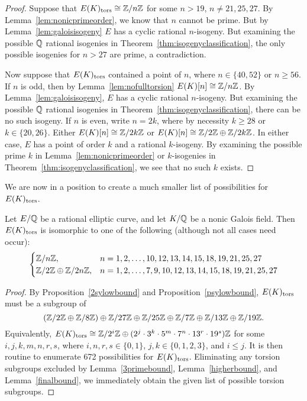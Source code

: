 \begin{proof}
Suppose that $E(K)_{\text{tors}} \cong \mathbb{Z}/n\mathbb{Z}$ for some $n > 19$, $n \neq 21, 25, 27$. By Lemma~\ref{lem:nonicprimeorder}, we know that $n$ cannot be prime. But by Lemma~\ref{lem:galoisisogeny} $E$ has a cyclic rational $n$-isogeny. But examining the possible $\mathbb{Q}$ rational isogenies in Theorem~\ref{thm:isogenyclassification}, the only possible isogenies for $n > 27$ are prime, a contradiction. 

Now suppose that $E(K)_{\text{tors}}$ contained a point of $n$, where $n \in \{ 40, 52 \}$ or $n \geq 56$. If $n$ is odd, then by Lemma~\ref{lem:nofulltorsion} $E(K)[n] \cong \mathbb{Z}/n\mathbb{Z}$. By Lemma~\ref{lem:galoisisogeny}, $E$ has a cyclic rational $n$-isogeny. But examining the possible $\mathbb{Q}$ rational isogenies in Theorem~\ref{thm:isogenyclassification}, there can be no such isogeny. If $n$ is even, write $n= 2k$, where by necessity $k \geq 28$ or $k \in \{ 20, 26 \}$. Either $E(K)[n] \cong \mathbb{Z}/2k\mathbb{Z}$ or $E(K)[n] \cong \mathbb{Z}/2\mathbb{Z} \oplus \mathbb{Z}/2k\mathbb{Z}$. In either case, $E$ has a point of order $k$ and a rational $k$-isogeny. By examining the possible prime $k$ in Lemma~\ref{lem:nonicprimeorder} or $k$-isogenies in Theorem~\ref{thm:isogenyclassification}, we see that no such $k$ exists.
\end{proof}


We are now in a position to create a much smaller list of possibilities for $E(K)_{\text{tors}}$.


\begin{prop} \label{nonicshortlist}
Let $E/\mathbb{Q}$ be a rational elliptic curve, and let $K/\mathbb{Q}$ be a nonic Galois field. Then $E(K)_{\text{tors}}$ is isomorphic to one of the following (although not all cases need occur):
	\[
	\begin{cases}
	\mathbb{Z}/n\mathbb{Z}, & n= 1, 2, \ldots, 10, 12, 13, 14, 15, 18, 19, 21, 25, 27 \\
	\mathbb{Z}/2\mathbb{Z} \oplus \mathbb{Z}/2n\mathbb{Z}, & n= 1, 2, \ldots, 7, 9, 10, 12, 13, 14, 15, 18, 19, 21, 25, 27
	\end{cases}
	\]
\end{prop}

\begin{proof}
By Proposition~\ref{2sylowbound} and Proposition~\ref{psylowbound}, $E(K)_{\text{tors}}$ must be a subgroup of 
	\[
	(\mathbb{Z}/2\mathbb{Z} \oplus \mathbb{Z}/8\mathbb{Z}) \oplus \mathbb{Z}/27\mathbb{Z} \oplus \mathbb{Z}/25\mathbb{Z} \oplus \mathbb{Z}/7\mathbb{Z} \oplus \mathbb{Z}/13\mathbb{Z} \oplus \mathbb{Z}/19\mathbb{Z}.
	\]
Equivalently, $E(K)_{\text{tors}} \cong \mathbb{Z}/2^i\mathbb{Z} \oplus (2^j \cdot 3^k \cdot 5^m \cdot 7^n \cdot 13^r \cdot 19^s)\mathbb{Z}$ for some $i, j, k, m, n, r, s$, where $i, n, r, s \in \{ 0, 1 \}$, $j, k \in \{ 0,1, 2, 3 \}$, and $i \leq j$. It is then routine to enumerate 672 possibilities for $E(K)_{\text{tors}}$. Eliminating any torsion subgroups excluded by Lemma~\ref{3primebound}, Lemma~\ref{higherbound}, and Lemma~\ref{finalbound}, we immediately obtain the given list of possible torsion subgroups. 
\end{proof}





